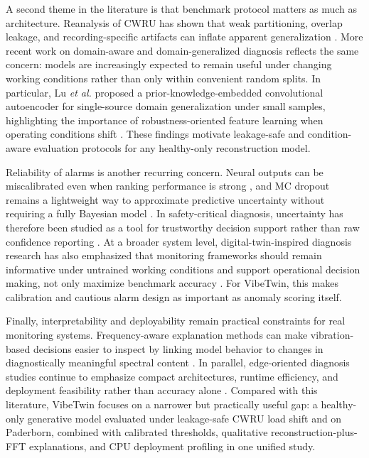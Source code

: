A second theme in the literature is that benchmark protocol matters as much as architecture. Reanalysis of CWRU has shown that weak partitioning, overlap leakage, and recording-specific artifacts can inflate apparent generalization \cite{hendriks2022benchmarking}. More recent work on domain-aware and domain-generalized diagnosis reflects the same concern: models are increasingly expected to remain useful under changing working conditions rather than only within convenient random splits. In particular, Lu \emph{et al.} proposed a prior-knowledge-embedded convolutional autoencoder for single-source domain generalization under small samples, highlighting the importance of robustness-oriented feature learning when operating conditions shift \cite{lu2025pkeca}. These findings motivate leakage-safe and condition-aware evaluation protocols for any healthy-only reconstruction model.

Reliability of alarms is another recurring concern. Neural outputs can be miscalibrated even when ranking performance is strong \cite{guo2017calibration}, and MC dropout remains a lightweight way to approximate predictive uncertainty without requiring a fully Bayesian model \cite{gal2016dropout}. In safety-critical diagnosis, uncertainty has therefore been studied as a tool for trustworthy decision support rather than raw confidence reporting \cite{zhou2023trustworthy}. At a broader system level, digital-twin-inspired diagnosis research has also emphasized that monitoring frameworks should remain informative under untrained working conditions and support operational decision making, not only maximize benchmark accuracy \cite{wang2023digitaltwin}. For VibeTwin, this makes calibration and cautious alarm design as important as anomaly scoring itself.

Finally, interpretability and deployability remain practical constraints for real monitoring systems. Frequency-aware explanation methods can make vibration-based decisions easier to inspect by linking model behavior to changes in diagnostically meaningful spectral content \cite{du2022igcwt}. In parallel, edge-oriented diagnosis studies continue to emphasize compact architectures, runtime efficiency, and deployment feasibility rather than accuracy alone \cite{ding2023edge}. Compared with this literature, VibeTwin focuses on a narrower but practically useful gap: a healthy-only generative model evaluated under leakage-safe CWRU load shift and on Paderborn, combined with calibrated thresholds, qualitative reconstruction-plus-FFT explanations, and CPU deployment profiling in one unified study.

